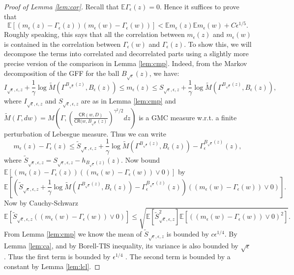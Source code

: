 \documentclass[11pt]{amsart}
\newcommand{\D}{\mathbb D}
\newcommand{\E}{\mathbb E}
\newcommand{\CR}{\mathsf{CR}}
\renewcommand{\1}{\mathbf 1}
\newcommand{\eps}{\epsilon}
\begin{document}
\begin{proof}[Proof of Lemma \ref{lem:cor}]
Recall that $\E \Gamma_\eps(z) = 0$. Hence it suffices to prove that
$$\E\left[\left(m_\eps(z)-\Gamma_\eps(z)\right)\left(m_\eps(w)-\Gamma_\eps(w)\right)\right] < \E m_\eps(z)\E m_\eps(w) +C\eps^{1/5}.$$
Roughly speaking, this says that all the correlation between $m_\eps(z)$ and $m_\eps(w)$ is contained in the correlation between $\Gamma_\eps(w)$ and $\Gamma_\eps(z)$. To show this, we will decompose the terms into correlated and decorrelated parts using a slightly more precise version of the comparison in Lemma \ref{lem:cmp}. Indeed, from the Markov decomposition of the GFF for the ball $B_{\sqrt{\eps}}(z)$, we have:
\begin{equation}\label{eq:correst}
I_{\sqrt{\eps},\eps,z} + \frac{1}{\gamma}\log \tilde M(\Gamma^{B_{\sqrt{\eps}}(z)},B_\eps(z)) \leq m_\eps(z) \leq S_{\sqrt{\eps},\eps,z} + \frac{1}{\gamma}\log \tilde M(\Gamma^{B_{\sqrt{\eps}}(z)},B_\eps(z)),
\end{equation}
where $I_{\sqrt{\eps},\eps,z}$ and $S_{\sqrt{\eps}, \eps, z}$ are as in Lemma \ref{lem:cmp} and $\tilde M(\Gamma, dw) = M(\Gamma, (\frac{\CR(w,D)}{\CR(w,B_{\sqrt{\eps}}(z)})^{\gamma^2/2}dz)$ is a GMC measure w.r.t. a finite perturbation of Lebesgue measure.
Thus we can write
$$m_\eps(z) -\Gamma_\eps(z) \leq \tilde S_{\sqrt{\eps},\eps,z} + \frac{1}{\gamma}\log \tilde M(\Gamma^{B_{\sqrt{\eps}}(z)},B_\eps(z)) - \Gamma_\eps^{B_{\sqrt{\eps}}(z)}(z),$$
where $\tilde S_{\sqrt{\eps},\eps, z} = S_{\sqrt{\eps},\eps,z} - h_{B_{\sqrt{\eps}}(z)}(z)$.
Now bound $\E\left[(m_\eps(z)-\Gamma_\eps(z))\left((m_\eps(w)-\Gamma_\eps(w))\vee 0\right)\right]$ by $$\E\left[(\tilde S_{\sqrt{\eps},\eps,z} +\frac{1}{\gamma}\log \tilde M(\Gamma^{B_{\sqrt{\eps}}(z)},B_\eps(z)) - \Gamma_\eps^{B_{\sqrt{\eps}}(z)}(z))\left((m_\eps(w)-\Gamma_\eps(w))\vee 0\right)\right].$$
Now by Cauchy-Schwarz
$$\E\left[\tilde S_{\sqrt{\eps},\eps,z}\left((m_\eps(w)-\Gamma_\eps(w))\vee 0\right)\right] \leq \sqrt{\E \left[\tilde S_{\sqrt{\eps},\eps,z}^2\right]\E \left[\left((m_\eps(w)-\Gamma_\eps(w))\vee 0\right)^2\right]}.$$
From Lemma \ref{lem:cmp} we know the mean of $\tilde S_{\sqrt{\eps},\eps,z}$ is bounded by $c\eps^{1/4}$. By Lemma \ref{lem:ca}, 
and by Borell-TIS inequality, its variance is also bounded by $\sqrt{\eps}$.
Thus the first term is bounded by $\eps^{1/4}$ . The second term is bounded by a constant by Lemma \ref{lem:lcl}.


\end{proof}
\end{document}
